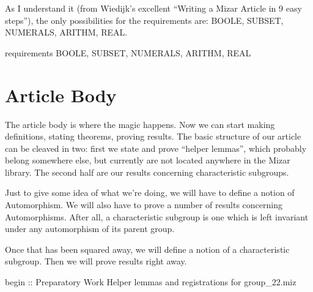 \begin{remark}
As I understand it (from Wiedijk's excellent ``Writing a Mizar Article
in 9 easy steps''), the only possibilities for the {\Tt{}requirements\nwendquote} are:
{\Tt{}BOOLE\nwendquote}, {\Tt{}SUBSET\nwendquote}, {\Tt{}NUMERALS\nwendquote}, {\Tt{}ARITHM\nwendquote}, {\Tt{}REAL\nwendquote}.
\end{remark}

\nwenddocs{}\endmoddef\nwstartdeflinemarkup{}\nwenddeflinemarkup
requirements BOOLE, SUBSET, NUMERALS, ARITHM, REAL
\nwendcode{}\nwdocspar
\nwenddocs{}%
\section{Article Body}\label{sec:characteristic:preparatory:start}

The article body is where the magic happens. Now we can start making
definitions, stating theorems, proving results. The basic structure of
our article can be cleaved in two: first we state and prove ``helper
lemmas'', which probably belong somewhere else, but currently are not
located anywhere in the Mizar library. The second half are our results
concerning characteristic subgroups.

Just to give some idea of what we're doing, we will have to define a
notion of {\Tt{}Automorphism\nwendquote}. We will also have to prove a number of
results concerning {\Tt{}Automorphism\nwendquote}s. After all, a characteristic
subgroup is one which is left invariant under any automorphism of its
parent group.

Once that has been squared away, we will define a notion of a
{\Tt{}characteristic\nwendquote} subgroup. Then we will prove results right away.

\nwenddocs{}\endmoddef\nwstartdeflinemarkup{}\nwenddeflinemarkup
begin :: Preparatory Work
\LA{}Helper lemmas and registrations for \code{}group{\_}22.miz\edoc{}~{\nwtagstyle{}}\RA{}

